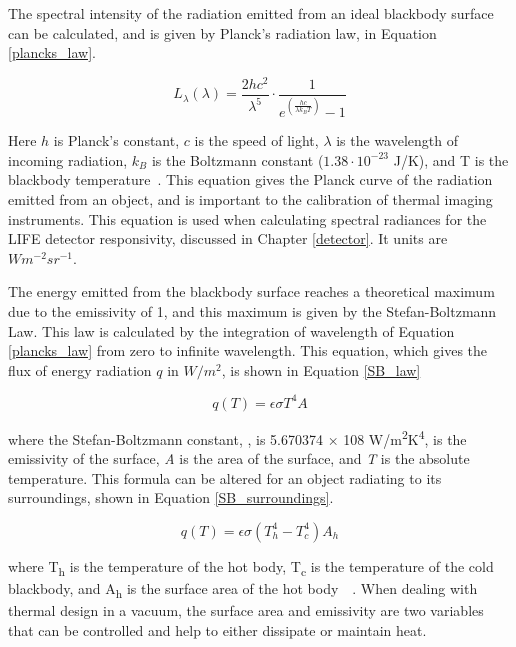 The spectral intensity of the radiation emitted from an ideal blackbody surface can be calculated, and is given by Planck's radiation law, in Equation \ref{plancks_law}.

\begin{equation}\label{plancks_law}
    L_{\lambda}(\lambda) = \frac{2hc^2}{\lambda^5}\cdot\frac{1}{e^{(\frac{hc}{\lambda k_B T})}-1}
\end{equation}

Here $h$ is Planck's constant, $c$ is the speed of light, $\lambda$ is the wavelength of incoming radiation, $k_B$ is the Boltzmann constant ($1.38\cdot 10^{-23}$ J/K), and T is the blackbody temperature~\citep{Heat_Transfer_Basics}. This equation gives the Planck curve of the radiation emitted from an object, and is important to the calibration of thermal imaging instruments. This equation is used when calculating spectral radiances for the LIFE detector responsivity, discussed in Chapter \ref{detector}. It units are $Wm^{-2}sr^{-1}$.

The energy emitted from the blackbody surface reaches a theoretical maximum due to the emissivity of 1, and this maximum is given by the Stefan-Boltzmann Law. This law is calculated by the integration of wavelength of Equation \ref{plancks_law} from zero to infinite wavelength. This equation, which gives the flux of energy radiation $q$ in $W/m^2$, is shown in Equation \ref{SB_law}

\begin{equation} \label{SB_law}
    q(T) = \epsilon \sigma T^{4}A
\end{equation}

where the Stefan-Boltzmann constant, \textsigma, is 5.670374 × 108 W/m\textsuperscript{2}K\textsuperscript{4}, {\textepsilon} is the emissivity of the surface, \textit{A} is the area of the surface, and \textit{T} is the absolute temperature. This formula can be altered for an object radiating to its surroundings, shown in Equation \ref{SB_surroundings}.

\begin{equation} \label{SB_surroundings}
    q(T) = \epsilon \sigma (T_h^4-T_c^4)A_h
\end{equation}

where T\textsubscript{h} is the temperature of the hot body, T\textsubscript{c} is the temperature of the cold blackbody, and A\textsubscript{h} is the surface area of the hot body~\citep{heat_transfer_textbook}~\citep{FEA_SW}. When dealing with thermal design in a vacuum, the surface area and emissivity are two variables that can be controlled and help to either dissipate or maintain heat.

